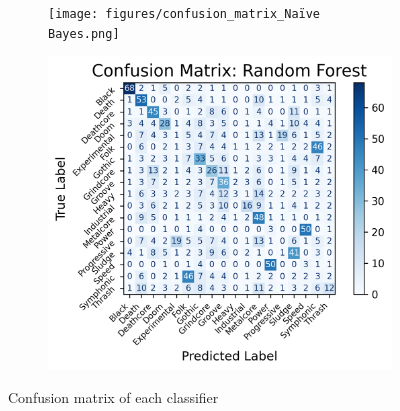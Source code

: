 \begin{figure}[h!]
\begin{subfigure}[b]{0.45\textwidth}
        \label{fig:subfig4}
    \end{subfigure}
    \begin{subfigure}[b]{0.45\textwidth}
        \centering
        \texttt{[image: figures/confusion\_matrix\_Naïve Bayes.png]}
        \label{fig:subfig5}
    \end{subfigure}
    \hfill
    \begin{subfigure}[b]{0.45\textwidth}
        \centering
        \includegraphics[width=\textwidth]{figures/confusion_matrix_Random Forest.png}
        \label{fig:subfig6}
    \end{subfigure}
    \caption{Confusion matrix of each classifier}
    \label{fig:grid}
\end{figure}

